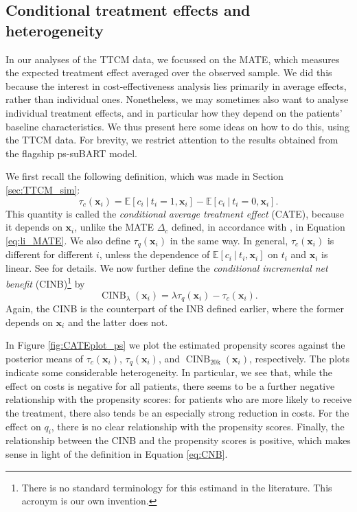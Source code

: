 \documentclass[aoas,preprint]{imsart}
\newcommand\given[1][]{\:#1\vert\:}
\theoremstyle{plain}
\theoremstyle{definition}
\theoremstyle{remark}
\begin{document}
\begin{appendix}
\subsection{Conditional treatment effects and heterogeneity}
\label{app:CATE}
In our analyses of the TTCM data, we focussed on the MATE, which measures the expected treatment effect averaged over the observed sample. We did this because the interest in cost-effectiveness analysis lies primarily in average effects, rather than individual ones. Nonetheless, we may sometimes also want to analyse individual treatment effects, and in particular how they depend on the patients' baseline characteristics. We thus present here some ideas on how to do this, using the TTCM data. For brevity, we restrict attention to the results obtained from the flagship ps-suBART model.

We first recall the following definition, which was made in Section \ref{sec:TTCM_sim}:
$$
    \tau_c(\mathbf{x}_i) = \mathbb{E}\left\lbrack c_i\given t_i = 1, \mathbf{x}_i\right\rbrack - \mathbb{E}\left\lbrack c_i\given t_i = 0, \mathbf{x}_i\right\rbrack.
$$
This quantity is called the \textit{conditional average treatment effect} (CATE), because it depends on $\mathbf{x}_i$, unlike the MATE $\Delta_c$ defined, in accordance with \citet{li2023bayesian}, in Equation \eqref{eq:li_MATE}. We also define $\tau_q(\mathbf{x}_i)$ in the same way.
In general, $\tau_c(\mathbf{x}_i)$ is different for different $i$, unless the dependence of $\mathbb{E}\left\lbrack c_i\given t_i, \mathbf{x}_i\right\rbrack$ on $t_i$ and $\mathbf{x}_i$ is linear. See \citet{li2023bayesian} for details. We now further define the \textit{conditional incremental net benefit} (CINB)\footnote{There is no standard terminology for this estimand in the literature. This acronym is our own invention.} by 
\begin{equation}\label{eq:CNB}
    \operatorname{CINB}_{\lambda}(\mathbf{x}_i) = \lambda \tau_q(\mathbf{x}_i) - \tau_c(\mathbf{x}_i).
\end{equation}
Again, the CINB is the counterpart of the INB defined earlier, where the former depends on $\mathbf{x}_i$ and the latter does not.

In Figure \ref{fig:CATEplot_ps} we plot the estimated propensity scores against the posterior means of $\tau_c(\mathbf{x}_i)$, $\tau_q(\mathbf{x}_i)$, and $\operatorname{CINB}_{20\mathrm{k}}(\mathbf{x}_i)$, respectively. The plots indicate some considerable heterogeneity. In particular, we see that, while the effect on costs is negative for all patients, there seems to be a further negative relationship with the propensity scores: for patients who are more likely to receive the treatment, there also tends be an especially strong reduction in costs. For the effect on $q_i$, there is no clear relationship with the propensity scores. Finally, the relationship between the CINB and the propensity scores is positive, which makes sense in light of the definition in Equation \eqref{eq:CNB}.


\end{appendix}
\end{document}
